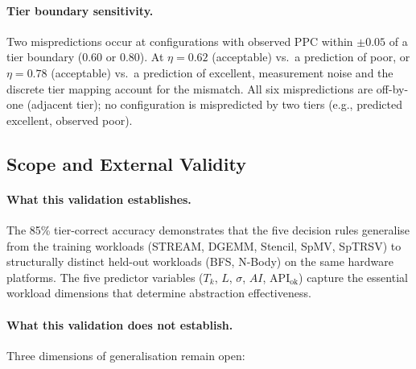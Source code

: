 \paragraph{Tier boundary sensitivity.}
Two mispredictions occur at configurations with observed PPC within
$\pm 0.05$ of a tier boundary (0.60 or 0.80). At $\eta = 0.62$
(acceptable) vs.\ a prediction of poor, or $\eta = 0.78$ (acceptable)
vs.\ a prediction of excellent, measurement noise and the discrete
tier mapping account for the mismatch. All six mispredictions are
off-by-one (adjacent tier); no configuration is mispredicted by two
tiers (e.g., predicted excellent, observed poor).

\subsection{Scope and External Validity}
\label{subsec:external_validity}

\paragraph{What this validation establishes.}
The 85\% tier-correct accuracy demonstrates that the five decision rules
generalise from the training workloads (STREAM, DGEMM, Stencil, SpMV,
SpTRSV) to structurally distinct held-out workloads (BFS, N-Body) on
the same hardware platforms. The five predictor variables ($T_k$, $L$,
$\sigma$, $AI$, $\text{API}_{\text{ok}}$) capture the essential workload
dimensions that determine abstraction effectiveness.

\paragraph{What this validation does not establish.}
Three dimensions of generalisation remain open:

